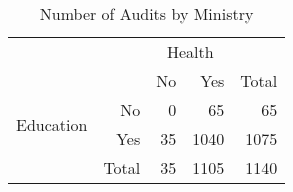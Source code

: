 \begin{table}[!htbp]
  \caption{\label{tab:auditbyministry}Number of Audits by Ministry}
  \centering
  \small
  \begin{tabular}{crrrr}
    \hline

    \hline
    & \multicolumn{4}{c}{\parbox{.25\textwidth}{\centering Health}} \T \B \\
    \multicolumn{1}{c}{\multirow{4}{*}{\parbox[c][][c]{.15\textwidth}{\centering Education}}} & \multicolumn{1}{l}{} & No & Yes & Total \T \B \\
                         \cline{2-5}
    \multicolumn{1}{c}{} & No    & 0  & 65   & 65   \T \B \\
    \multicolumn{1}{c}{} & Yes   & 35 & 1040 & 1075 \T \B \\
                         \cline{2-5}
    \multicolumn{1}{c}{} & Total & 35 & 1105 & 1140 \T \B \\
    \hline

    \hline
  \end{tabular}
\end{table}